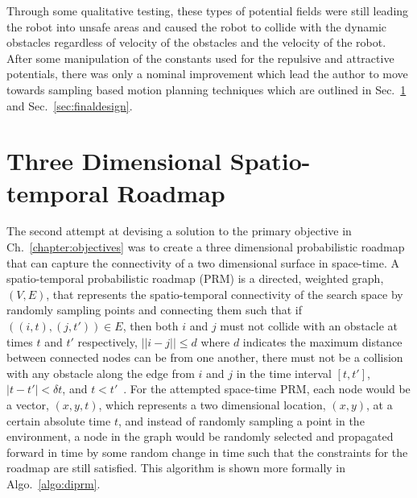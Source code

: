Through some qualitative testing, these types of potential fields were still
leading the robot into unsafe areas and caused the robot to collide with the
dynamic obstacles regardless of velocity of the obstacles and the velocity of
the robot. After some manipulation of the constants used for the repulsive and
attractive potentials, there was only a nominal improvement which lead the
author to move towards sampling based motion planning techniques which are
outlined in Sec.~\ref{sec:stroadmap} and Sec.~\ref{sec:finaldesign}.

\section{Three Dimensional Spatio-temporal Roadmap}

\label{sec:stroadmap}

The second attempt at devising a solution to the primary objective in
Ch.~\ref{chapter:objectives} was to create a three dimensional probabilistic
roadmap that can capture the connectivity of a two dimensional surface in
space-time. A spatio-temporal probabilistic roadmap (PRM) is a directed,
weighted graph, $(V, E)$, that represents the spatio-temporal connectivity of
the search space by randomly sampling points and connecting them such that if
$((i, t), (j, t')) \in E$, then both $i$ and $j$ must not collide with an
obstacle at times $t$ and $t'$ respectively, $||i - j|| \leq d$ where $d$
indicates the maximum distance between connected nodes can be from one another,
there must not be a collision with any obstacle along the edge from $i$ and $j$
in the time interval $[t, t']$, $|t - t'| < \delta t$, and $t < t'$~\cite{prm,
stprm}.  For the attempted space-time PRM, each node would be a vector, $(x, y,
t)$, which represents a two dimensional location, $(x, y)$, at a certain
absolute time $t$, and instead of randomly sampling a point in the environment,
a node in the graph would be randomly selected and propagated forward in time
by some random change in time such that the constraints for the roadmap are
still satisfied.  This algorithm is shown more formally in
Algo.~\ref{algo:diprm}.

